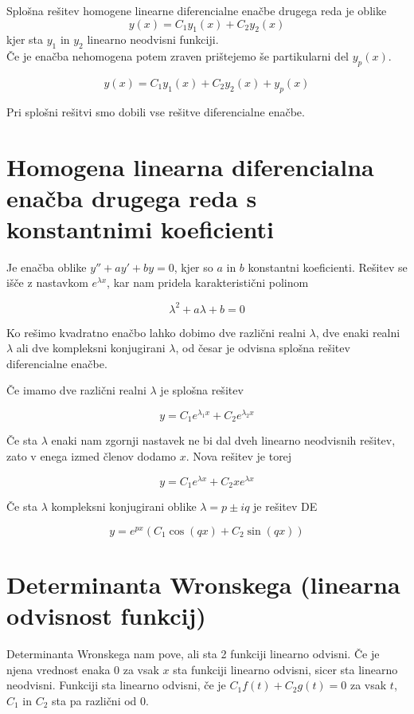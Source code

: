 \documentclass[12pt]{report}
\begin{document}
Splošna rešitev homogene linearne diferencialne enačbe drugega reda je oblike
\[y(x) = C_1y_1(x)+C_2y_2(x)\] 
kjer sta $y_1$ in $y_2$ linearno neodvisni funkciji. \\

Če je enačba nehomogena potem zraven prištejemo še partikularni del $y_p(x)$. 

\[y(x) = C_1y_1(x)+C_2y_2(x)+ y_p(x)\] 

Pri splošni rešitvi smo dobili vse rešitve diferencialne enačbe.


\section*{Homogena linearna diferencialna enačba drugega reda s konstantnimi koeficienti}

Je enačba oblike $y'' + ay' +by = 0$, kjer so $a$ in $b$ konstantni koeficienti. Rešitev se išče z nastavkom $e^{\lambda x}$, kar nam pridela karakteristični polinom

\[ \lambda ^2 + a\lambda + b = 0\]

Ko rešimo kvadratno enačbo lahko dobimo dve različni realni $\lambda$, dve enaki realni $\lambda$ ali dve kompleksni konjugirani $\lambda$, od česar je odvisna splošna rešitev diferencialne enačbe.

Če imamo dve različni realni $\lambda$ je splošna rešitev

\[y=C_1e^{\lambda_1x}+C_2e^{\lambda_2x}\]

Če sta $\lambda$ enaki nam zgornji nastavek ne bi dal dveh linearno neodvisnih rešitev, zato v enega izmed členov dodamo $x$. Nova rešitev je torej

\[y=C_1e^{\lambda x}+C_2xe^{\lambda x}\]


Če sta $\lambda$ kompleksni konjugirani oblike $\lambda = p\pm iq$ je rešitev DE

\[y=e^{px}(C_1 \cos(qx)+C_2 \sin(qx)) \]


\section*{Determinanta Wronskega (linearna odvisnost funkcij)}


Determinanta Wronskega nam pove, ali sta 2 funkciji linearno odvisni. Če je njena vrednost enaka 0 za vsak $x$ sta funkciji linearno odvisni, sicer sta linearno neodvisni. Funkciji sta linearno odvisni, če je $C_1f(t)+C_2g(t)=0$ za vsak $t$, $C_1$ in $C_2$ sta pa različni od 0.
\end{document}
